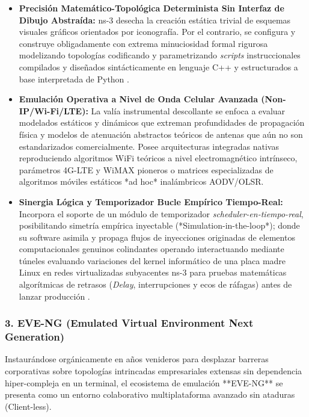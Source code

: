 \documentclass[a4paper,12pt]{article}
\begin{document}
\begin{itemize}
    \item \textbf{Precisión Matemático-Topológica Determinista Sin Interfaz de Dibujo Abstraída:} ns-3 desecha la creación estática trivial de esquemas visuales gráficos orientados por iconografía. Por el contrario, se configura y construye obligadamente con extrema minuciosidad formal rigurosa modelizando topologías codificando y parametrizando \textit{scripts} instruccionales compilados y diseñados sintácticamente en lenguaje C++ y estructurados a base interpretada de Python \cite{tanenbaum2021}.
    \item \textbf{Emulación Operativa a Nivel de Onda Celular Avanzada (Non-IP/Wi-Fi/LTE):} La valía instrumental descollante se enfoca a evaluar modelados estáticos y dinámicos que extreman profundidades de propagación física y modelos de atenuación abstractos teóricos de antenas que aún no son estandarizados comercialmente. Posee arquitecturas integradas nativas reproduciendo algoritmos WiFi teóricos a nivel electromagnético intrínseco, parámetros 4G-LTE y WiMAX pioneros o matrices especializadas de algoritmos móviles estáticos *ad hoc* inalámbricos AODV/OLSR.
    \item \textbf{Sinergia Lógica y Temporizador Bucle Empírico Tiempo-Real:} Incorpora el soporte de un módulo de temporizador \textit{scheduler-en-tiempo-real}, posibilitando simetría empírica inyectable (*Simulation-in-the-loop*); donde su software asimila y propaga flujos de inyecciones originadas de elementos computacionales genuinos colindantes operando interactuando mediante túneles evaluando variaciones del kernel informático de una placa madre Linux en redes virtualizadas subyacentes ns-3 para pruebas matemáticas algorítmicas de retrasos (\textit{Delay}, interrupciones y ecos de ráfagas) antes de lanzar producción \cite{kurose2017}.
\end{itemize}

\subsubsection*{3. EVE-NG (Emulated Virtual Environment Next Generation)}
Instaurándose orgánicamente en años venideros para desplazar barreras corporativas sobre topologías intrincadas empresariales extensas sin dependencia hiper-compleja en un terminal, el ecosistema de emulación **EVE-NG** se presenta como un entorno colaborativo multiplataforma avanzado sin ataduras (Client-less).
\end{document}
